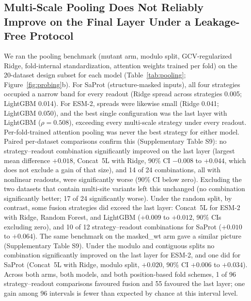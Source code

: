 \documentclass[11pt,a4paper]{article}
\newcommand{\revised}[1]{#1}
\newcommand{\rtwo}[1]{#1}
\newcommand{\rthree}[1]{#1}
\begin{document}
\subsection{\revised{Multi-Scale Pooling \rthree{Does Not Reliably Improve on the Final Layer} Under a Leakage-Free Protocol}}

\revised{We ran the pooling benchmark (mutant arm, modulo
split, GCV-regularized Ridge, fold-internal standardization, attention weights trained
per fold) on the 20-dataset design subset for each model
(Table~\ref{tab:pooling}; Figure~\ref{fig:probing}b).
For SaProt (structure-masked inputs), all four strategies occupied a narrow band for
every readout (Ridge spread across strategies 0.005; LightGBM 0.014). For ESM-2,
spreads were likewise small (Ridge 0.041; LightGBM 0.050), and the best single
configuration was the last layer with LightGBM ($\rho = 0.508$), exceeding every
multi-scale strategy under every readout. Per-fold-trained attention pooling was
never the best strategy for either model. \rtwo{Paired per-dataset comparisons confirm
this (Supplementary Table \rthree{S9}): no strategy--readout combination
\rthree{significantly improved on} the last layer (largest mean difference $+0.018$, Concat~5L with Ridge, 90\%
CI $-0.008$ to $+0.044$\rthree{, which does not exclude a gain of that size}), and 14 of 24 combinations, all with nonlinear readouts, were
significantly worse (90\% CI below zero).} \rthree{Excluding the two datasets that
contain multi-site variants left this unchanged (no combination significantly better;
17 of 24 significantly worse). Under the random split, by contrast, some fusion
strategies did exceed the last layer: Concat~5L for ESM-2 with Ridge, Random Forest,
and LightGBM ($+0.009$ to $+0.012$, 90\% CIs excluding zero), and 10 of 12
strategy--readout combinations for SaProt ($+0.010$ to $+0.064$).} \rthree{The same
benchmark on the masked\_wt arm gave a similar picture (Supplementary Table S9). Under
the modulo and contiguous splits no combination significantly improved on the last
layer for ESM-2, and one did for SaProt (Concat~5L with Ridge, modulo split, $+0.020$,
90\% CI $+0.006$ to $+0.034$). Across both arms, both models, and both position-based
fold schemes, 1 of 96 strategy--readout comparisons favoured fusion and 55 favoured
the last layer; one gain among 96 intervals is fewer than expected by chance at this
interval level.}}
\end{document}
